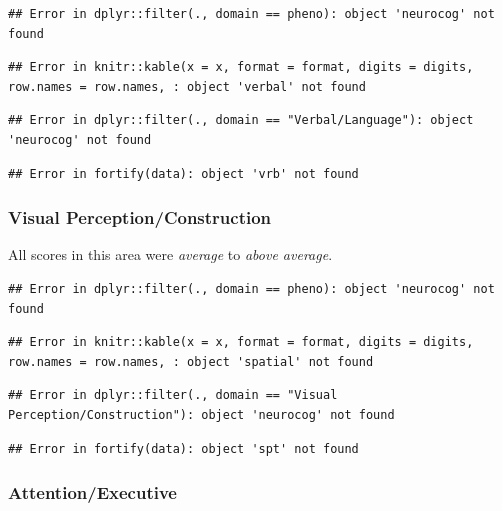 \documentclass[%
numbers=noendperiod,
parskip=half,
bibliography=totoc,
DIV=calc,headsepline=true,
]{scrartcl}
\begin{document}
\begin{verbatim}
## Error in dplyr::filter(., domain == pheno): object 'neurocog' not found
\end{verbatim}




\begin{verbatim}
## Error in knitr::kable(x = x, format = format, digits = digits, row.names = row.names, : object 'verbal' not found
\end{verbatim}

\begin{verbatim}
## Error in dplyr::filter(., domain == "Verbal/Language"): object 'neurocog' not found
\end{verbatim}

\begin{verbatim}
## Error in fortify(data): object 'vrb' not found
\end{verbatim}

\newpage

\hypertarget{visual-perceptionconstruction}{%
\subsubsection{Visual Perception/Construction}\label{visual-perceptionconstruction}}

All scores in this area were \emph{average} to \emph{above average}.

\begin{verbatim}
## Error in dplyr::filter(., domain == pheno): object 'neurocog' not found
\end{verbatim}




\begin{verbatim}
## Error in knitr::kable(x = x, format = format, digits = digits, row.names = row.names, : object 'spatial' not found
\end{verbatim}

\begin{verbatim}
## Error in dplyr::filter(., domain == "Visual Perception/Construction"): object 'neurocog' not found
\end{verbatim}

\begin{verbatim}
## Error in fortify(data): object 'spt' not found
\end{verbatim}

\newpage

\hypertarget{attentionexecutive}{%
\subsubsection{Attention/Executive}\label{attentionexecutive}}
\end{document}
